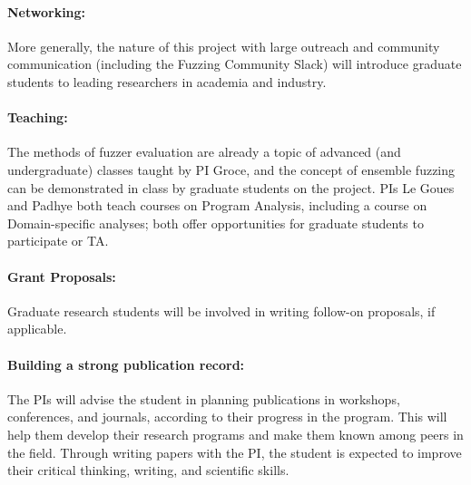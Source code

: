 \documentclass[12pt]{article}
\begin{document}
\paragraph{Networking:}  More generally, the nature of this project with large outreach and community communication (including the Fuzzing Community Slack) will introduce graduate students to leading researchers in academia and industry.

\paragraph{Teaching:}  The methods of fuzzer evaluation are already a topic of advanced (and undergraduate) classes taught by PI Groce, and the concept of ensemble fuzzing can be demonstrated in class by graduate students on the project.  PIs Le Goues and Padhye both teach courses on Program Analysis, including a course on Domain-specific analyses; both offer opportunities for graduate students to participate or TA. 

\paragraph{Grant Proposals:}  Graduate research students will be involved in writing follow-on proposals, if applicable.

\paragraph{Building a strong publication record:}  The PIs will advise the student in planning publications in workshops, conferences, and journals, according to their progress in the program. This will help them develop their research programs and make them known among peers in the field. Through writing papers with the PI, the student is expected to improve their critical thinking, writing, and scientific skills.
\end{document}
